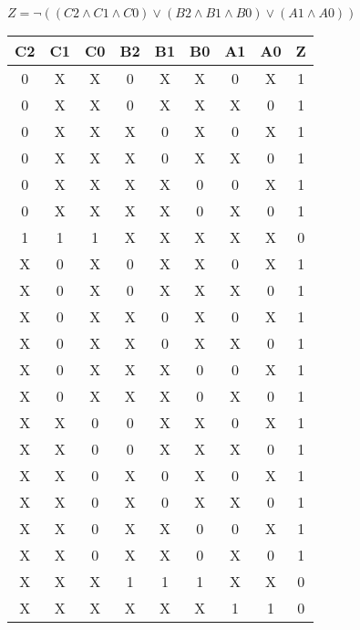 \begin{center}
    {\(Z = \lnot ((C2 \land C1 \land C0) \lor (B2 \land B1 \land B0) \lor (A1 \land A0)) \)}
    \begin{table}[h] %
        \begin{center}
            \begin{tabular}{|c|c|c|c|c|c|c|c||c|} \hline
            C2 & C1 & C0 & B2 & B1 & B0 & A1 & A0 & Z \\ \hline\hline
            0  & X  & X  & 0  & X  & X  & 0  & X  & 1 \\ \hline
            0  & X  & X  & 0  & X  & X  & X  & 0  & 1 \\ \hline
            0  & X  & X  & X  & 0  & X  & 0  & X  & 1 \\ \hline
            0  & X  & X  & X  & 0  & X  & X  & 0  & 1 \\ \hline
            0  & X  & X  & X  & X  & 0  & 0  & X  & 1 \\ \hline
            0  & X  & X  & X  & X  & 0  & X  & 0  & 1 \\ \hline
            1  & 1  & 1  & X  & X  & X  & X  & X  & 0 \\ \hline
            X  & 0  & X  & 0  & X  & X  & 0  & X  & 1 \\ \hline
            X  & 0  & X  & 0  & X  & X  & X  & 0  & 1 \\ \hline
            X  & 0  & X  & X  & 0  & X  & 0  & X  & 1 \\ \hline
            X  & 0  & X  & X  & 0  & X  & X  & 0  & 1 \\ \hline
            X  & 0  & X  & X  & X  & 0  & 0  & X  & 1 \\ \hline
            X  & 0  & X  & X  & X  & 0  & X  & 0  & 1 \\ \hline
            X  & X  & 0  & 0  & X  & X  & 0  & X  & 1 \\ \hline
            X  & X  & 0  & 0  & X  & X  & X  & 0  & 1 \\ \hline
            X  & X  & 0  & X  & 0  & X  & 0  & X  & 1 \\ \hline
            X  & X  & 0  & X  & 0  & X  & X  & 0  & 1 \\ \hline
            X  & X  & 0  & X  & X  & 0  & 0  & X  & 1 \\ \hline
            X  & X  & 0  & X  & X  & 0  & X  & 0  & 1 \\ \hline
            X  & X  & X  & 1  & 1  & 1  & X  & X  & 0 \\ \hline
            X  & X  & X  & X  & X  & X  & 1  & 1  & 0 \\ \hline
            \end{tabular}
        \end{center}
    \end{table}
\end{center}

